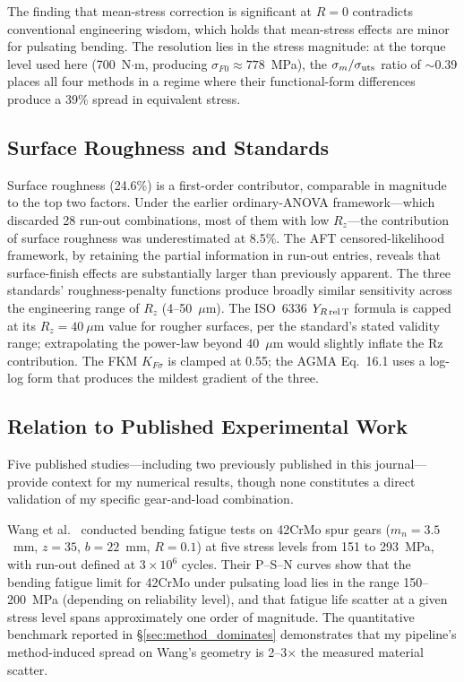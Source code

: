\documentclass[12pt,a4paper]{article}
\begin{document}
The finding that mean-stress correction is significant at $R=0$
contradicts conventional engineering wisdom, which holds that
mean-stress effects are minor for pulsating bending. The resolution lies
in the stress magnitude: at the torque level used here (700~N$\cdot$m,
producing $\sigma_{F0} \approx 778$~MPa), the $\sigma_m/\sigma_{\rm uts}$
ratio of $\sim$0.39 places all four methods in a regime where their
functional-form differences produce a 39\% spread in equivalent stress.

\subsection{Surface Roughness and Standards}

Surface roughness (24.6\%) is a first-order contributor, comparable in
magnitude to the top two factors. Under the earlier ordinary-ANOVA
framework---which discarded 28 run-out combinations, most of them with
low $R_z$---the contribution of surface roughness was underestimated at
8.5\%. The AFT censored-likelihood framework, by retaining the partial
information in run-out entries, reveals that surface-finish effects are
substantially larger than previously apparent. The three standards'
roughness-penalty functions produce broadly similar sensitivity across
the engineering range of $R_z$ (4--50~$\mu$m). The ISO~6336
$Y_{R\,\rm rel\,T}$ formula is capped at its $R_z=40~\mu$m value for
rougher surfaces, per the standard's stated validity range; extrapolating
the power-law beyond 40~$\mu$m would slightly inflate the Rz contribution.
The FKM $K_{F\sigma}$ is clamped at 0.55; the AGMA Eq.~16.1 uses a
log-log form that produces the mildest gradient of the three.

\subsection{Relation to Published Experimental Work}

Five published studies---including two previously published in
this journal---provide context for my numerical results, though
none constitutes a direct validation of my specific
gear-and-load combination.

Wang et al.~\cite{wang2023} conducted bending fatigue tests on 42CrMo
spur gears ($m_n{=}3.5$~mm, $z{=}35$, $b{=}22$~mm, $R{=}0.1$) at five
stress levels from 151 to 293~MPa, with run-out defined at $3\times10^6$
cycles. Their P--S--N curves show that the bending fatigue limit for
42CrMo under pulsating load lies in the range 150--200~MPa (depending on
reliability level), and that fatigue life scatter at a given stress level
spans approximately one order of magnitude. The quantitative
benchmark reported in \S\ref{sec:method_dominates} demonstrates that
my pipeline's method-induced spread on Wang's geometry is
2--3$\times$ the measured material scatter.
\end{document}
